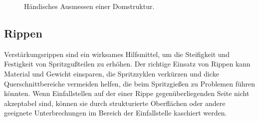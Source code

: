 \begin{figure}[ht]
    \centering 
\caption{H\"andisches Ausmessen einer Domstruktur.} 
\label{im:domes}
\end{figure} 

\subsection{Rippen}
Verst\"arkungsrippen sind ein wirksames Hilfsmittel, um die Steifigkeit und Festigkeit von Spritzgu{\ss}teilen zu erhöhen.
Der richtige Einsatz von Rippen kann Material und Gewicht einsparen, die Spritzzyklen verkürzen und dicke Querschnittbereiche vermeiden helfen, die beim Spritzgie{\ss}en zu Problemen führen könnten. Wenn Einfallstellen auf der einer Rippe
gegen\"uberliegenden Seite nicht akzeptabel sind, k\"onnen sie durch strukturierte Oberflächen oder andere geeignete Unterbrechungen im Bereich der Einfallstelle kaschiert werden.

